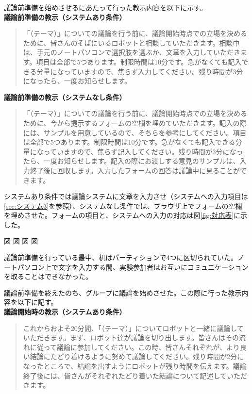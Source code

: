\documentclass[11pt, a4paper]{jreport} %
\begin{document}
議論前準備を始めさせるにあたって行った教示内容を以下に示す。\\

\textbf{議論前準備の教示（システムあり条件）}
\begin{quote}
「（テーマ）」についての議論を行う前に、議論開始時点での立場を決めるために、皆さんのそばにいるロボットと相談していただきます。相談中は、手元のノートパソコンで選択肢を選ぶか、文章を入力していただきます。項目は全部で5つあります。制限時間は10分です。急がなくても記入できる分量になっていますので、焦らず入力してください。残り時間が3分になったら、一度お知らせします。
\end{quote}

\textbf{議論前準備の教示（システムなし条件）}
\begin{quote}
「（テーマ）」についての議論を行う前に、議論開始時点での立場を決めるために、今から提示するフォームの空欄を埋めていただきます。記入の際には、サンプルを用意しているので、そちらを参考にしてください。項目は全部で5つあります。制限時間は10分です。急がなくても記入できる分量になっていますので、焦らず記入してください。残り時間が3分になったら、一度お知らせします。記入の際にお渡しする意見のサンプルは、入力終了後に回収します。入力したフォームの回答は議論中に見ることができます。
\end{quote}


システムあり条件では議論システムに文章を入力させ（システムへの入力項目は\ref{sec:システム3}を参照）、システムなし条件では、ブラウザ上でフォームの空欄を埋めさせた。フォームの項目と、システムへの入力の対応は図\ref{fig:対応表}に示した。

図
図
図
図


議論前準備を行っている最中、机はパーティションで4つに区切られていた。ノートパソコン上で文字を入力する間、実験参加者はお互いにコミュニケーションを取ることはできなかった。

議論前準備を終えたのち、グループに議論を始めさせた。この際に行った教示内容を以下に記す。\\
\textbf{議論開始時の教示（システムあり条件）}
\begin{quote}
これからおよそ20分間、「（テーマ）」についてロボットと一緒に議論していただきます。まず、ロボット達が議論を切り出します。皆さんはその流れに従って議論に参加してください。この時、皆さんそれぞれが、より良い結論にたどり着けるように努めて議論してください。残り時間が2分になったところで、結論を出すようにロボットが残り時間を伝えます。議論終了後には、皆さんがそれぞれたどり着いた結論について記述していただきます。
\end{quote}
\end{document}
